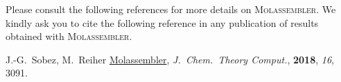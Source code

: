 \documentclass[]{tufte-book}
\begin{document}
Please consult the following references for more details on
\textsc{Molassembler}. We kindly ask you to cite the following reference in any
publication of results obtained with \textsc{Molassembler}.
\vspace{1.0cm}

J.-G.~Sobez, M.~Reiher
\href{https://pubs.acs.org/doi/10.1021/acs.jctc.8b00169}{Molassembler}, \textit{J.~Chem.~Theory Comput.}, \textbf{2018}, \textit{16}, 3091.




\backmatter




\end{document}
